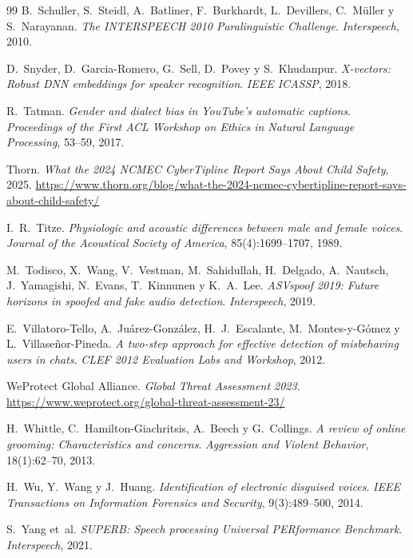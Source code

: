 \documentclass[11pt,a4paper]{article}
\begin{document}
\begin{thebibliography}{99}
 B.~Schuller, S.~Steidl, A.~Batliner, F.~Burkhardt, L.~Devillers, C.~Müller y S.~Narayanan. \emph{The INTERSPEECH 2010 Paralinguistic Challenge}. \emph{Interspeech}, 2010.

 D.~Snyder, D.~Garcia-Romero, G.~Sell, D.~Povey y S.~Khudanpur. \emph{X-vectors: Robust DNN embeddings for speaker recognition}. \emph{IEEE ICASSP}, 2018.

 R.~Tatman. \emph{Gender and dialect bias in YouTube's automatic captions}. \emph{Proceedings of the First ACL Workshop on Ethics in Natural Language Processing}, 53--59, 2017.

 Thorn. \emph{What the 2024 NCMEC CyberTipline Report Says About Child Safety}, 2025. \url{https://www.thorn.org/blog/what-the-2024-ncmec-cybertipline-report-says-about-child-safety/}

 I.~R.~Titze. \emph{Physiologic and acoustic differences between male and female voices}. \emph{Journal of the Acoustical Society of America}, 85(4):1699--1707, 1989.

 M.~Todisco, X.~Wang, V.~Vestman, M.~Sahidullah, H.~Delgado, A.~Nautsch, J.~Yamagishi, N.~Evans, T.~Kinnunen y K.~A.~Lee. \emph{ASVspoof 2019: Future horizons in spoofed and fake audio detection}. \emph{Interspeech}, 2019.

 E.~Villatoro-Tello, A.~Juárez-González, H.~J.~Escalante, M.~Montes-y-Gómez y L.~Villaseñor-Pineda. \emph{A two-step approach for effective detection of misbehaving users in chats}. \emph{CLEF 2012 Evaluation Labs and Workshop}, 2012.

 WeProtect Global Alliance. \emph{Global Threat Assessment 2023}. \url{https://www.weprotect.org/global-threat-assessment-23/}

 H.~Whittle, C.~Hamilton-Giachritsis, A.~Beech y G.~Collings. \emph{A review of online grooming: Characteristics and concerns}. \emph{Aggression and Violent Behavior}, 18(1):62--70, 2013.

 H.~Wu, Y.~Wang y J.~Huang. \emph{Identification of electronic disguised voices}. \emph{IEEE Transactions on Information Forensics and Security}, 9(3):489--500, 2014.

 S.~Yang et~al. \emph{SUPERB: Speech processing Universal PERformance Benchmark}. \emph{Interspeech}, 2021.

\end{thebibliography}
\end{document}

